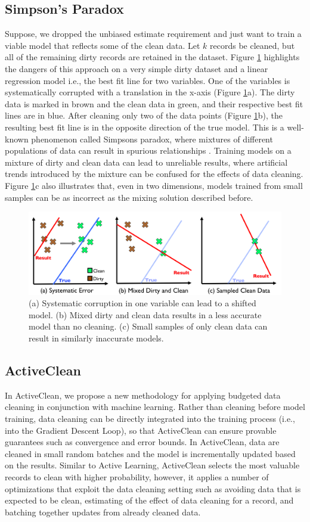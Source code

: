 \subsection{Simpson's Paradox}
Suppose, we dropped the unbiased estimate requirement and just want to train a viable model that reflects some of the clean data.
Let $k$ records be cleaned, but all of the remaining dirty records are retained in the dataset.
Figure \ref{update-arch1} highlights the dangers of this approach on a very simple dirty dataset and a linear regression model i.e., the best fit line for two variables. 
One of the variables is systematically corrupted with a translation in the x-axis (Figure \ref{update-arch1}a).
The dirty data is marked in brown and the clean data in green, and their respective best fit lines are in blue.
After cleaning only two of the data points (Figure \ref{update-arch1}b), the resulting best fit line is in the opposite direction of the true model.
This is a well-known phenomenon called Simpsons paradox, where mixtures of different populations of data can result in spurious relationships \cite{simpson1951interpretation}.
Training models on a mixture of dirty and clean data can lead to unreliable results, where artificial trends introduced by the mixture can be confused for the effects of data cleaning.
Figure \ref{update-arch1}c also illustrates that, even in two dimensions, models trained from small samples can be as incorrect as the mixing solution described before.

\begin{figure}[ht!]
\centering
 \includegraphics[width=0.6\columnwidth]{figs/update-arch.png}
 \caption{(a) Systematic corruption in one variable can lead to a shifted model. 
 (b) Mixed dirty and clean data results in a less accurate model than no cleaning.
(c) Small samples of only clean data can result in similarly inaccurate models. \label{update-arch1}}
\end{figure}

\subsection{ActiveClean}
In ActiveClean, we propose a new methodology for applying budgeted data cleaning in conjunction with machine learning.
Rather than cleaning before model training, data cleaning can be directly integrated into the training process (i.e., into the Gradient Descent Loop), so that ActiveClean can ensure provable guarantees such as convergence and error bounds.
In ActiveClean, data are cleaned in small random batches and the model is incrementally updated based on the results.
Similar to Active Learning, ActiveClean selects the most valuable records to clean with higher probability, however, it applies a number of optimizations that exploit the data cleaning setting such as avoiding data that is expected to be clean, estimating of the effect of data cleaning for a record, and batching together updates from already cleaned data.

